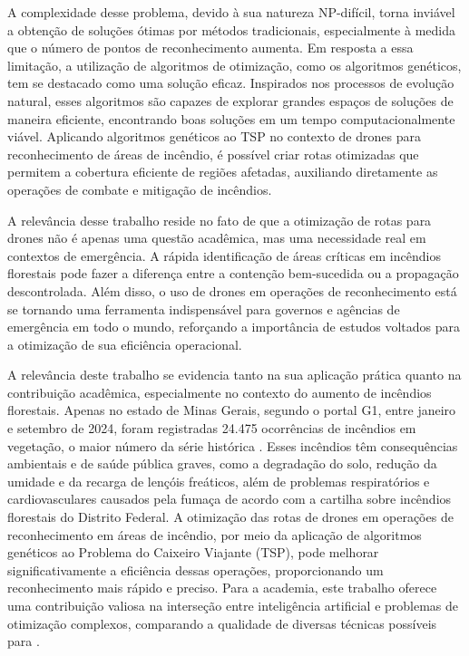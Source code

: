 \documentclass[
	12pt,				%
	openright,			%
	oneside,			%
	a4paper,			%
	chapter=TITLE,		%
	subsection=TITLE,	%
	english,			%
	brazil,				%
	]{abntex2}
\begin{document}
A complexidade desse problema, devido à sua natureza NP-difícil, torna inviável a obtenção de soluções ótimas por métodos tradicionais, especialmente à medida que o número de pontos de reconhecimento aumenta. Em resposta a essa limitação, a utilização de algoritmos de otimização, como os algoritmos genéticos, tem se destacado como uma solução eficaz. Inspirados nos processos de evolução natural, esses algoritmos são capazes de explorar grandes espaços de soluções de maneira eficiente, encontrando boas soluções em um tempo computacionalmente viável. Aplicando algoritmos genéticos ao TSP no contexto de drones para reconhecimento de áreas de incêndio, é possível criar rotas otimizadas que permitem a cobertura eficiente de regiões afetadas, auxiliando diretamente as operações de combate e mitigação de incêndios.

A relevância desse trabalho reside no fato de que a otimização de rotas para drones não é apenas uma questão acadêmica, mas uma necessidade real em contextos de emergência. A rápida identificação de áreas críticas em incêndios florestais pode fazer a diferença entre a contenção bem-sucedida ou a propagação descontrolada. Além disso, o uso de drones em operações de reconhecimento está se tornando uma ferramenta indispensável para governos e agências de emergência em todo o mundo, reforçando a importância de estudos voltados para a otimização de sua eficiência operacional.


A relevância deste trabalho se evidencia tanto na sua aplicação prática quanto na contribuição acadêmica, especialmente no contexto do aumento de incêndios florestais. Apenas no estado de Minas Gerais, segundo o portal G1, entre janeiro e setembro de 2024, foram registradas 24.475 ocorrências de incêndios em vegetação, o maior número da série histórica . Esses incêndios têm consequências ambientais e de saúde pública graves, como a degradação do solo, redução da umidade e da recarga de lençóis freáticos, além de problemas respiratórios e cardiovasculares causados pela fumaça de acordo com a cartilha sobre incêndios florestais do Distrito Federal. A otimização das rotas de drones em operações de reconhecimento em áreas de incêndio, por meio da aplicação de algoritmos genéticos ao Problema do Caixeiro Viajante (TSP), pode melhorar significativamente a eficiência dessas operações, proporcionando um reconhecimento mais rápido e preciso. Para a academia, este trabalho oferece uma contribuição valiosa na interseção entre inteligência artificial e problemas de otimização complexos, comparando a qualidade de diversas técnicas possíveis para .
\end{document}
